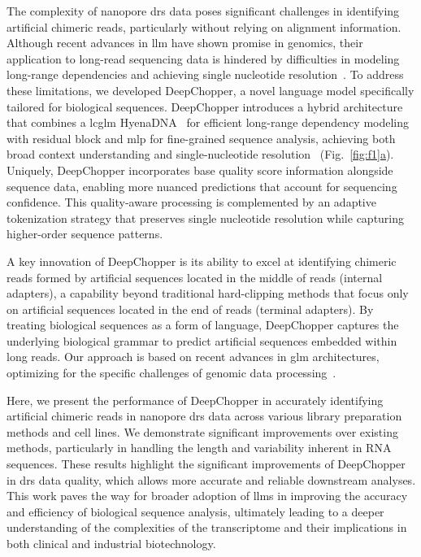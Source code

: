 \documentclass[pdflatex, sn-mathphys-num, lineno]{sn-jnl}%
\newcommand{\figref}[2]{Fig.~\hyperref[#1]{\ref*{#1}#2}}
\theoremstyle{thmstyleone}%
\theoremstyle{thmstyletwo}%
\theoremstyle{thmstylethree}%
\begin{document}
The complexity of nanopore \gls{drs} data poses significant challenges in identifying artificial chimeric reads, particularly without relying on alignment information.
Although recent advances in \gls{llm} have shown promise in genomics, their application to long-read sequencing data is hindered by difficulties in modeling long-range dependencies and achieving single nucleotide resolution~\cite{dalla2023nucleotide, tay2022efficient, zhou2023dnabert2}.
To address these limitations, we developed DeepChopper, a novel language model specifically tailored for biological sequences.
DeepChopper introduces a hybrid architecture that combines a \gls{lcglm} HyenaDNA~\cite{nguyen2024hyenadna} for efficient long-range dependency modeling with residual block and \gls{mlp} for fine-grained sequence analysis, achieving both broad context understanding and single-nucleotide resolution~\cite{poli2023hyena, he2016deep} (\figref{fig:f1}{a}).
Uniquely, DeepChopper incorporates base quality score information alongside sequence data, enabling more nuanced predictions that account for sequencing confidence.
This quality-aware processing is complemented by an adaptive tokenization strategy that preserves single nucleotide resolution while capturing higher-order sequence patterns.

A key innovation of DeepChopper is its ability to excel at identifying chimeric reads formed by artificial sequences located in the middle of reads (internal adapters), a capability beyond traditional hard-clipping methods that focus only on artificial sequences located in the end of reads (terminal adapters).
By treating biological sequences as a form of language, DeepChopper captures the underlying biological grammar to predict artificial sequences embedded within long reads.
Our approach is based on recent advances in \gls{glm} architectures, optimizing for the specific challenges of genomic data processing~\cite{nguyen2024hyenadna}.

Here, we present the performance of DeepChopper in accurately identifying artificial chimeric reads in nanopore \gls{drs} data across various library preparation methods and cell lines.
We demonstrate significant improvements over existing methods, particularly in handling the length and variability inherent in RNA sequences.
These results highlight the significant improvements of DeepChopper in \gls{drs} data quality, which allows more accurate and reliable downstream analyses.
This work paves the way for broader adoption of \glspl{llm} in improving the accuracy and efficiency of biological sequence analysis, ultimately leading to a deeper understanding of the complexities of the transcriptome and their implications in both clinical and industrial biotechnology.
\end{document}
